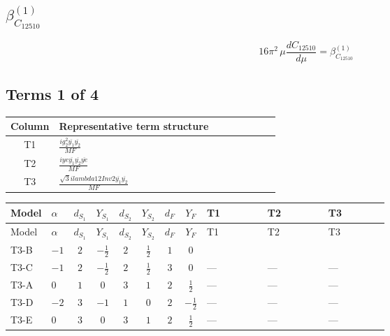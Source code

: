 \documentclass[8pt]{article}
\begin{document}
\begin{landscape}
\section*{$\beta_{C_{12510}}^{(1)}$}
\[16\pi^2\,\mu\frac{d C_{12510}}{d\mu}=\beta_{C_{12510}}^{(1)}\]
\subsection*{Terms 1 of 4}
\begin{center}
\begin{tabular}{@{}c >{\raggedright\arraybackslash}p{0.82\linewidth}@{}}
\toprule
Column & Representative term structure \\
\midrule
T1 & \(\displaystyle \frac{i g_{2}^{2} \overline{y_{1}} \overline{y_{2}}}{MF}\) \\
\midrule
T2 & \(\displaystyle \frac{i ye \overline{y_{1}} \overline{y_{2}} \overline{ye}}{MF}\) \\
\midrule
T3 & \(\displaystyle \frac{\sqrt{3} i lambda12Inv2 \overline{y_{1}} \overline{y_{2}}}{MF}\) \\
\midrule
\bottomrule
\end{tabular}
\end{center}
\smallskip
\tiny
\begin{longtable}{@{}llcccccc >{\raggedright\arraybackslash}p{0.21\linewidth} >{\raggedright\arraybackslash}p{0.21\linewidth} >{\raggedright\arraybackslash}p{0.21\linewidth}@{}}
\toprule
Model & $\alpha$ & $d_{S_1}$ & $Y_{S_1}$ & $d_{S_2}$ & $Y_{S_2}$ & $d_F$ & $Y_F$ & T1 & T2 & T3 \\
\midrule
\endfirsthead
\toprule
Model & $\alpha$ & $d_{S_1}$ & $Y_{S_1}$ & $d_{S_2}$ & $Y_{S_2}$ & $d_F$ & $Y_F$ & T1 & T2 & T3 \\
\midrule
\endhead
T3-B & $-1$ & $2$ & $-\frac{1}{2}$ & $2$ & $\frac{1}{2}$ & $1$ & $0$ & \scriptsize\adjustbox{max width=\linewidth}{$\begin{gathered} \frac{3 i g_{2}^{2} \overline{y_{1}} \overline{y_{2}}}{8 MF}\end{gathered}$} & \scriptsize\adjustbox{max width=\linewidth}{$\begin{gathered} - \frac{i ye \overline{y_{1}} \overline{y_{2}} \overline{ye}}{8 MF}\end{gathered}$} & \scriptsize\adjustbox{max width=\linewidth}{$\begin{gathered} \frac{\sqrt{3} i lambda12Inv2 \overline{y_{1}} \overline{y_{2}}}{6 MF}\end{gathered}$} \\
\midrule
T3-C & $-1$ & $2$ & $-\frac{1}{2}$ & $2$ & $\frac{1}{2}$ & $3$ & $0$ & --- & --- & --- \\
\midrule
T3-A & $0$ & $1$ & $0$ & $3$ & $1$ & $2$ & $\frac{1}{2}$ & --- & --- & --- \\
\midrule
T3-D & $-2$ & $3$ & $-1$ & $1$ & $0$ & $2$ & $-\frac{1}{2}$ & --- & --- & --- \\
\midrule
T3-E & $0$ & $3$ & $0$ & $3$ & $1$ & $2$ & $\frac{1}{2}$ & --- & --- & --- \\
\midrule
\bottomrule
\end{longtable}
\clearpage

\end{landscape}
\end{document}
